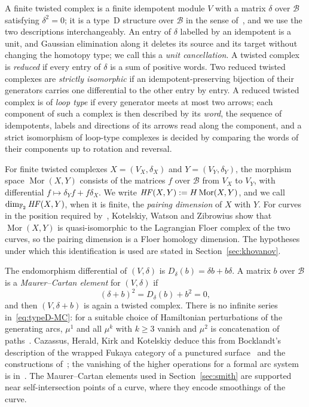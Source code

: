 A finite twisted complex is a finite idempotent module $V$ with a matrix $\delta$ over $\mathcal B$ satisfying
$\delta^2=0$; it is a type~D structure over $\mathcal B$ in the sense of~\cite{KWZ}, and we use the two descriptions
interchangeably. An entry of $\delta$ labelled by an idempotent is a unit, and Gaussian elimination along it
deletes its source and its target without changing the homotopy type; we call this a \emph{unit cancellation}. A
twisted complex is \emph{reduced} if every entry of $\delta$ is a sum of positive words. Two reduced twisted
complexes are \emph{strictly isomorphic} if an idempotent-preserving bijection of their generators carries one
differential to the other entry by entry. A reduced twisted complex is of \emph{loop type} if every generator
meets at most two arrows; each component of such a complex is then described by its \emph{word}, the sequence of
idempotents, labels and directions of its arrows read along the component, and a strict isomorphism of
loop-type complexes is decided by comparing the words of their components up to rotation and reversal.

For finite twisted complexes $X=(V_X,\delta_X)$ and $Y=(V_Y,\delta_Y)$, the morphism space
$\operatorname{Mor}(X,Y)$ consists of the matrices $f$ over $\mathcal B$ from $V_X$ to $V_Y$, with differential
$f\mapsto\delta_Yf+f\delta_X$. We write $\mathit{HF}(X,Y):=H\operatorname{Mor}(X,Y)$, and we call
$\dim_{\mathbb{F}_2}\mathit{HF}(X,Y)$, when it is finite, the \emph{pairing dimension} of $X$ with $Y$. For curves in the
position required by~\cite[Thm.~5.22]{KWZ}, Kotelskiy, Watson and Zibrowius show that
$\operatorname{Mor}(X,Y)$ is quasi-isomorphic to the Lagrangian Floer complex of the two curves, so the
pairing dimension is a Floer homology dimension. The hypotheses under which this identification is used are stated in Section~\ref{sec:khovanov}.

The endomorphism differential of $(V,\delta)$ is $D_\delta(b)=\delta b+b\delta$. A matrix $b$ over $\mathcal B$ is
a \emph{Maurer--Cartan element} for $(V,\delta)$ if
\begin{equation}\label{eq:typeD-MC}
(\delta+b)^2=D_\delta(b)+b^2=0,
\end{equation}
and then $(V,\delta+b)$ is again a twisted complex. There is no infinite series in~\eqref{eq:typeD-MC}: for a
suitable choice of Hamiltonian perturbations of the generating arcs, $\mu^1$ and all $\mu^k$ with $k\ge3$ vanish and
$\mu^2$ is concatenation of paths~\cite[\S11.5]{CHKK}. Cazassus, Herald, Kirk and Kotelskiy deduce this from
Bocklandt's description of the wrapped Fukaya category of a punctured surface~\cite[Thm.~7.6]{Bocklandt} and the
constructions of~\cite[\S3]{HKK}; the vanishing of the higher operations for a formal arc system is
in~\cite[\S3.4]{HKK}. The Maurer--Cartan elements used in Section~\ref{sec:smith} are supported near
self-intersection points of a curve, where they encode smoothings of the curve.

